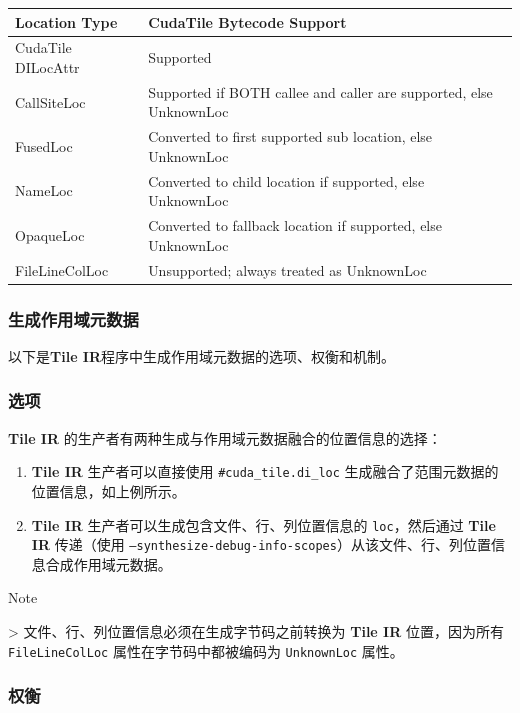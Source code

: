 \documentclass{article}
\begin{document}
\begin{longtable}{l|l}
\hline
Location Type & CudaTile Bytecode Support \\ \hline
CudaTile DILocAttr & Supported \\ \hline
CallSiteLoc & Supported if BOTH callee and caller are supported, else UnknownLoc \\ \hline
FusedLoc & Converted to first supported sub location, else UnknownLoc \\ \hline
NameLoc & Converted to child location if supported, else UnknownLoc \\ \hline
OpaqueLoc & Converted to fallback location if supported, else UnknownLoc \\ \hline
FileLineColLoc & Unsupported; always treated as UnknownLoc \\ \hline
\end{longtable}


\subsubsection{生成作用域元数据}

以下是\textbf{Tile IR}程序中生成作用域元数据的选项、权衡和机制。


\subsubsection{选项}

\textbf{Tile IR} 的生产者有两种生成与作用域元数据融合的位置信息的选择：

\begin{enumerate}
\item \textbf{Tile IR} 生产者可以直接使用 \texttt{\#cuda\_tile.di\_loc} 生成融合了范围元数据的位置信息，如上例所示。
\item \textbf{Tile IR} 生产者可以生成包含文件、行、列位置信息的 \texttt{loc}，然后通过 \textbf{Tile IR} 传递（使用 \texttt{--synthesize-debug-info-scopes}）从该文件、行、列位置信息合成作用域元数据。

\end{enumerate}
Note

> 文件、行、列位置信息必须在生成字节码之前转换为 \textbf{Tile IR} 位置，因为所有 \texttt{FileLineColLoc} 属性在字节码中都被编码为 \texttt{UnknownLoc} 属性。





\subsubsection{权衡}
\end{document}
